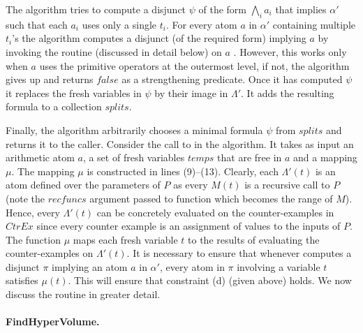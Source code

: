 The \SG algorithm tries to compute a disjunct $\psi$ of the form $\bigwedge_i a_i$ 
that implies $\alpha'$ such that each $a_i$ uses only a single $t_i$. 
For every atom $a$ in $\alpha'$ containing multiple $t_i$'s the algorithm computes 
a disjunct (of the required form) implying $a$ by invoking the routine \hypervol (discussed in detail below) on $a$ .
However, this works only when $a$ uses the primitive operators at the outermost level, 
if not, the algorithm gives up and returns $false$ as a strengthening predicate.
Once it has computed $\psi$ it replaces the fresh variables in $\psi$ by their image in $\Lambda'$.
It adds the resulting formula to a collection $splits$.

Finally, the algorithm arbitrarily chooses a minimal formula $\psi$ from $splits$ and returns it to 
the caller.
Consider the call to \hypervol in the \SG algorithm. It takes as input an arithmetic atom $a$, 
a set of fresh variables $temps$ that are free in $a$ and a mapping $\mu$.
The mapping $\mu$ is constructed in lines (9)--(13). Clearly, each $\Lambda'(t)$
is an atom defined over the parameters of $P$ as every $M(t)$ is a recursive call to $P$
(note the $recfuncs$ argument passed to \group function which becomes the range of $M$).
Hence, every $\Lambda'(t)$ can be concretely evaluated on the counter-examples in 
$CtrEx$ since every counter example is an assignment of values to the inputs of $P$.
The function $\mu$ maps each fresh variable $t$ to the results of evaluating the 
counter-examples on $\Lambda'(t)$.
It is necessary to ensure that whenever \SG computes a disjunct $\pi$ implying 
an atom $a$ in $\alpha'$, every atom in $\pi$ involving a variable $t$ satisfies $\mu(t)$.
This will ensure that constraint (d) (given above) holds.
We now discuss the routine \hypervol in greater detail.

\paragraph{FindHyperVolume.}

